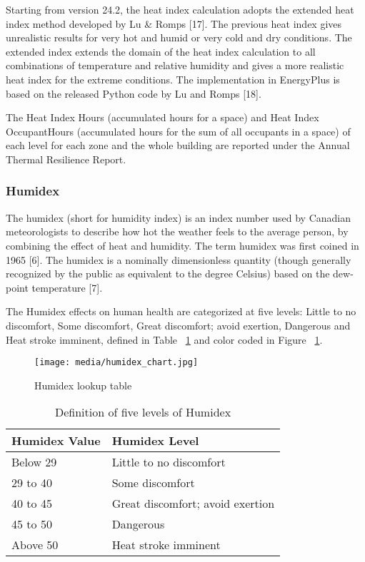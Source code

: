 Starting from version 24.2, the heat index calculation adopts the extended heat
index method developed by Lu & Romps [17]. The previous heat index gives
unrealistic results for very hot and humid or very cold and dry conditions. The
extended index extends the domain of the heat index calculation to all
combinations of temperature and relative humidity and gives a more realistic heat
index for the extreme conditions. The implementation in EnergyPlus is based on
the released Python code by Lu and Romps [18].

The Heat Index Hours (accumulated hours for a space) and Heat Index
OccupantHours (accumulated hours for the sum of all occupants in a space) of
each level for each zone and the whole building are reported under the Annual
Thermal Resilience Report.

\subsubsection{Humidex}\label{humidex}

The humidex (short for humidity index) is an index number used by Canadian
meteorologists to describe how hot the weather feels to the average person, by
combining the effect of heat and humidity. The term humidex was first coined in
1965 [6]. The humidex is a nominally dimensionless quantity (though generally
recognized by the public as equivalent to the degree Celsius) based on the
dew-point temperature [7].

The Humidex effects on human health are categorized at five levels: Little to no
discomfort, Some discomfort, Great discomfort; avoid exertion, Dangerous and
Heat stroke imminent, defined in Table ~\ref{table:humidex-chart} and color
coded in Figure ~\ref{fig:humidex-lookup-table}.

\begin{figure}[hbtp] 
\centering
\texttt{[image: media/humidex\_chart.jpg]}
\caption{Humidex lookup table \protect \label{fig:humidex-lookup-table}}
\end{figure}

\begin{table}
\centering
\caption{Definition of five levels of Humidex \protect \label{table:humidex-chart}} \tabularnewline
\begin{tabular}{ |p{1in}|p{3in}|  }
\hline
      \textbf{Humidex Value} & \textbf{Humidex Level} \\ \hline
      Below 29 & Little to no discomfort \\ \hline
      29 to 40 & Some discomfort \\ \hline
      40 to 45 & Great discomfort; avoid exertion \\ \hline
      45 to 50 & Dangerous \\ \hline
      Above 50 & Heat stroke imminent \\ \hline
\end{tabular}
\end{table}

